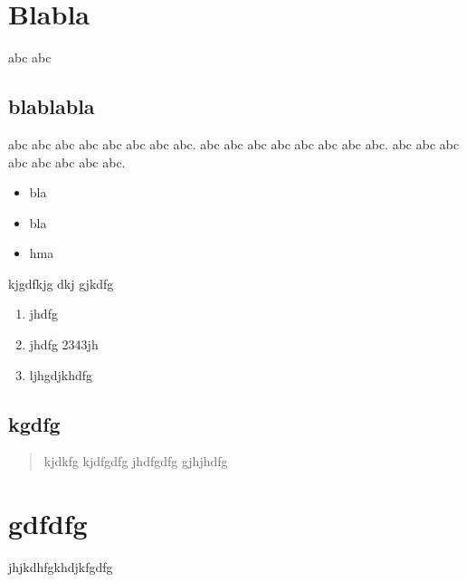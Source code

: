 \section{Blabla}\label{blabla}

abc abc

\subsection{blablabla}\label{blablabla}

abc abc abc abc abc abc abc abc. abc abc abc abc abc abc abc abc. abc
abc abc abc abc abc abc abc.

\begin{itemize}
\itemsep1pt\parskip0pt
\item
  bla
\item
  bla
\item
  hma
\end{itemize}

kjgdfkjg dkj gjkdfg

\begin{enumerate}
\def\labelenumi{\arabic{enumi}.}
\itemsep1pt\parskip0pt
\item
  jhdfg
\item
  jhdfg 2343jh
\item
  ljhgdjkhdfg
\end{enumerate}

\subsection{kgdfg}\label{kgdfg}

\begin{quote}
kjdkfg kjdfgdfg jhdfgdfg gjhjhdfg
\end{quote}

\section{gdfdfg}\label{gdfdfg}

jhjkdhfgkhdjkfgdfg
